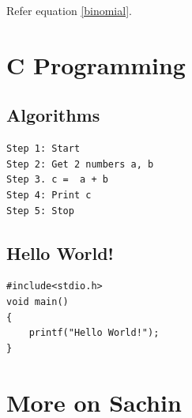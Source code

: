 \documentclass{report}
\begin{document}
Refer equation \ref{binomial}.

\chapter{C Programming}
\section{Algorithms}
\begin{lstlisting}
Step 1: Start
Step 2: Get 2 numbers a, b
Step 3. c =  a + b
Step 4: Print c
Step 5: Stop
\end{lstlisting}

\section{Hello World!}
\begin{lstlisting}
#include<stdio.h>
void main()
{
    printf("Hello World!");
}
\end{lstlisting}
\chapter{More on Sachin}
\end{document}
